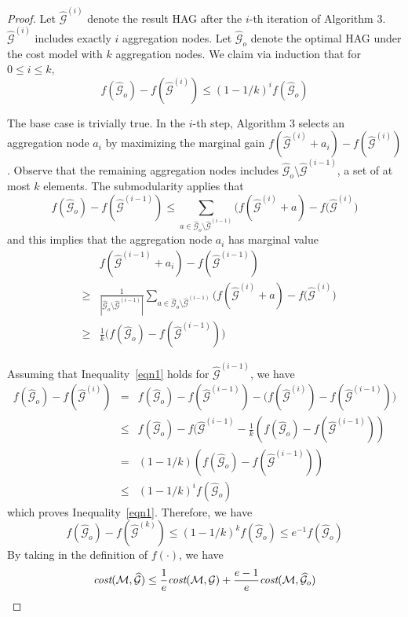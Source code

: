 \documentclass{article}
\newcommand{\er}[1]{\mbox{\rm\em #1}}
\newcommand{\xg}{HAG\xspace}
\newcommand{\mw}[1] {\mathcal{\widehat{#1}}}
\newcommand{\m}[1] {\mathcal{#1}}
\begin{document}
\begin{proof}
Let $\mw{G}^{(i)}$ denote the result \xg after the $i$-th iteration of Algorithm 3. $\mw{G}^{(i)}$ includes exactly $i$ aggregation nodes. Let $\mw{G}_o$ denote the optimal \xg under the cost model with $k$ aggregation nodes. We claim via induction that for $0\leq i \leq k$,
\begin{equation}
\label{eqn1}
f(\mw{G}_o) - f(\mw{G}^{(i)}) \leq (1 - 1/k)^i f(\mw{G}_o) 
\end{equation}

The base case is trivially true. In the $i$-th step, Algorithm 3 selects an aggregation node $a_i$ by maximizing the marginal gain $f(\mw{G}^{(i)} + a_i) - f(\mw{G}^{(i)})$. Observe that the remaining aggregation nodes includes $\mw{G}_o \setminus \mw{G}^{(i-1)}$, a set of at most $k$ elements. The submodularity applies that
$$
f(\mw{G}_o) - f(\mw{G}^{(i-1)}) \leq \sum_{a \in \mw{G}_o \setminus \mw{G}^{(i-1)}} \big( f(\mw{G}^{(i)} + a) - f(\mw{G}^{(i)} \big)
$$
and this implies that the aggregation node $a_i$ has marginal value
\begin{eqnarray*}
& & f(\mw{G}^{(i-1)} + a_i) - f(\mw{G}^{(i-1)}) \\
&\geq &\frac{1}{|\mw{G}_o \setminus \mw{G}^{(i-1)}|}\sum_{a\in \mw{G}_o \setminus \mw{G}^{(i-1)}}{\big( f(\mw{G}^{(i)} + a) - f(\mw{G}^{(i)} \big)} \\
&\geq & \frac{1}{k} \big( f(\mw{G}_o) - f(\mw{G}^{(i-1)})\big)
\end{eqnarray*}

Assuming that Inequality~\ref{eqn1} holds for $\mw{G}^{(i-1)}$, we have
\begin{eqnarray*}
f(\mw{G}_o) - f(\mw{G}^{(i)}) & = &f(\mw{G}_o) - f(\mw{G}^{(i-1)}) - \big( f(\mw{G}^{(i)}) - f(\mw{G}^{(i-1)}) \big)\\
& \leq & f(\mw{G}_o) - f(\mw{G}^{(i-1)} - \frac{1}{k} (f(\mw{G}_o) - f(\mw{G}^{(i-1)})) \\
& = & (1 - 1/k) (f(\mw{G}_o) - f(\mw{G}^{(i-1)})) \\
& \leq & (1-1/k)^i f(\mw{G}_o)
\end{eqnarray*}
which proves Inequality~\ref{eqn1}. Therefore, we have
$$
f(\mw{G}_o) - f(\mw{G}^{(k)}) \leq (1-1/k)^k f(\mw{G}_o) \leq e^{-1} f(\mw{G}_o)
$$
By taking in the definition of $f(\cdot)$, we have
$$
\er{cost}(\m{M}, \mw{G}) \leq \frac{1}{e} \er{cost}(\m{M}, \m{G}) + \frac{e-1}{e} \er{cost}(\m{M}, \mw{G}_o)
$$
\end{proof}



\end{document}
